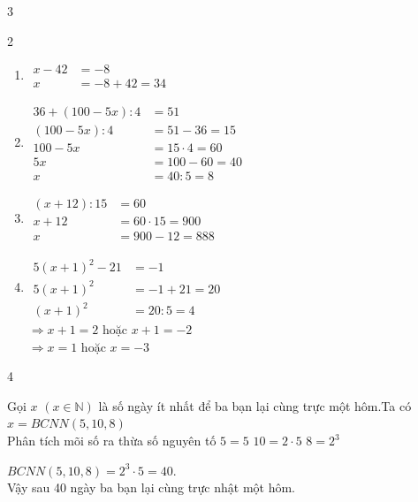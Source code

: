 \begin{Solbook}{3}
 \par \noindent \begin {multicols}{2} \begin {enumerate} \item $\begin {aligned} x - 42 &= -8\\ x &= -8 + 42 = 34 \end {aligned}$ \par \item $\begin {aligned} 36 + (100 - 5x):4 &= 51\\ (100 - 5x):4 &= 51 - 36 = 15\\ 100 - 5x &= 15\cdot 4 = 60\\ 5x &= 100 - 60 = 40\\ x &= 40:5 = 8 \end {aligned}$ \par \item $\begin {aligned} (x + 12):15 &= 60\\ x + 12 &= 60\cdot 15 = 900\\ x &= 900 - 12 = 888 \end {aligned}$ \par \item $\begin {aligned} 5(x + 1)^2 - 21 &= -1\\ 5(x + 1)^2 &= -1 + 21 = 20\\ (x + 1)^2 &= 20:5 = 4 \end {aligned}$\\ $\Rightarrow x + 1 = 2$ hoặc $x + 1 = -2$\\ $\Rightarrow x = 1$ hoặc $x = -3$ \end {enumerate} \end {multicols} \par  \hfill \qedEX 
\end{Solbook}
\begin{Solbook}{4}
 \par \noindent Gọi $x$ $(x\in \mathbb {N})$ là số ngày ít nhất để ba bạn lại cùng trực một hôm.Ta có $x=BCNN(5,10,8)$\\ Phân tích mõi số ra thừa số nguyên tố $5=5$ \hspace {1cm} $10=2\cdot 5$\hspace {1cm} $8=2^3$ \par $BCNN(5,10,8)=2^3\cdot 5=40$.\\ Vậy sau 40 ngày ba bạn lại cùng trực nhật một hôm.  \hfill \qedEX 
\end{Solbook}
